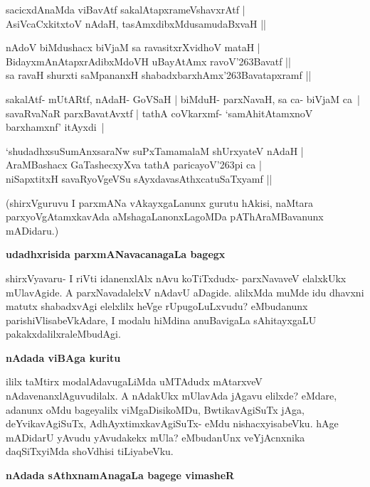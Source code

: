 \begin{itemize}
{\bf 
\item[1.] sacicxdAnaMda viBavAtf sakalAtapxrameVshavxrAtf |\\\label{157}
AsiVcaCxkitxtoV nAdaH, tasAmxdibxMdusamudaBxvaH ||
\item[2.] nAdoV biMdushacx biVjaM sa ravasitxrXvidhoV mataH |\\
BidayxmAnAtapxrAdibxMdoVH uBayAtAmx ravoV\char'263Bavatf ||\\
sa ravaH shurxti saMpananxH shabadxbarxhAmx\char'263Bavatapxramf ||}
\end{itemize}

\begin{artha}
sakalAtf- mUtARtf, nAdaH- GoVSaH | biMduH- parxNavaH, sa ca- biVjaM ca~| savaRvaNaR parxBava\-tAvxtf | tathA coVkarxmf- `samAhitAtamxnoV barxhamxnf' itAyxdi~|
\end{artha}

\begin{shloka}
`shudadhxsuSumAnxsaraNw suPxTamamalaM shUrxyateV nAdaH |\\\label{157}
AraMBashacx GaTashecxyXva tathA paricayoV\char'263pi ca |\\\label{157}
niSapxtitxH savaRyoVgeVSu sAyxdavasAthxcatuSaTxyamf ||
\end{shloka}

\noindent
(shirxVguruvu I parxmANa vAkayxgaLanunx gurutu hAkisi, naMtara parxyoVgAtamxkavAda aMshagaLanonxLa\-goMDa pAThAraMBavanunx mADidaru.)

{\bigskip
\noindent
{\large\bf udadhxrisida parxmANavacanagaLa bagegx}}\label{page158}
\medskip

\noindent
shirxVyavaru- I riVti idanenxlAlx nAvu koTiTxdudx- parxNavaveV elalxkUkx mUlavAgide. A parxNavadalelxV nAdavU aDagide. alilxMda muMde idu dhavxni matutx shabadxvAgi elelxlilx heVge rUpugoLuLxvudu? eMbu\-danunx parishiVlisabeVkAdare, I modalu hiMdina anuBavigaLa sAhitayxgaLU pakakxdalilxraleMbudAgi.

{\bigskip
\noindent
{\large\bf nAdada viBAga kuritu}}\label{page158}
\medskip

\noindent
ililx taMtirx modalAdavugaLiMda uMTAdudx mAtarxveV nAdavenanxlAguvudilalx. A nAdakUkx mUla\-vAda jAgavu elilxde? eMdare, adanunx oMdu bageyalilx viMgaDisikoMDu, BwtikavAgiSuTx jAga, deYvika\-vAgiSuTx, AdhAyxtimxkavAgiSuTx- eMdu nishacxyisabeVku. hAge mADidarU yAvudu yAvudakekx mUla? eMbudanUnx veYjAcnxnika daqSiTxyiMda shoVdhisi tiLiyabeVku.

{\bigskip
\noindent
{\large\bf nAdada sAthxnamAnagaLa bagege vimasheR}}\label{page158}
\medskip

